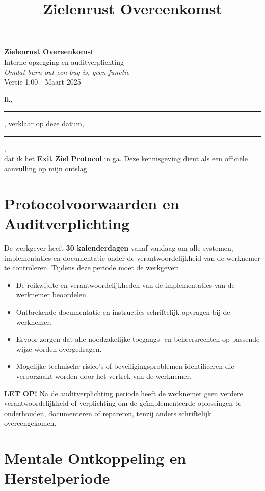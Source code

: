 \documentclass[a4paper,11pt]{article}
\title{Zielenrust Overeenkomst}
\date{}
\begin{document}
\pagestyle{empty}

\begin{center}
    {\LARGE \textbf{Zielenrust Overeenkomst}}\\[1em]
    {\large Interne opzegging en auditverplichting}\\[0.5em]
    \textit{Omdat burn-out een bug is, geen functie}\\[0.5em]
    {\small Versie 1.00 - Maart 2025}
\end{center}

\vspace{2em}

Ik, \rule{7cm}{0.2pt}, verklaar op deze datum, \rule{4cm}{0.2pt},\\
dat ik het \textbf{Exit Ziel Protocol} in ga. Deze kennisgeving dient als een officiële aanvulling op mijn ontslag.

\section*{Protocolvoorwaarden en Auditverplichting}

De werkgever heeft \textbf{30 kalenderdagen} vanaf vandaag om alle systemen, implementaties en documentatie onder de verantwoordelijkheid van de werknemer te controleren. Tijdens deze periode moet de werkgever:

\begin{itemize}
    \item De reikwijdte en verantwoordelijkheden van de implementaties van de werknemer beoordelen.
    \item Ontbrekende documentatie en instructies schriftelijk opvragen bij de werknemer.
    \item Ervoor zorgen dat alle noodzakelijke toegangs- en beheersrechten op passende wijze worden overgedragen.
    \item Mogelijke technische risico's of beveiligingsproblemen identificeren die veroorzaakt worden door het vertrek van de werknemer.
\end{itemize}

\textbf{LET OP!} Na de auditverplichting periode heeft de werknemer geen verdere verantwoordelijkheid of verplichting om de geïmplementeerde oplossingen te onderhouden, documenteren of repareren, tenzij anders schriftelijk overeengekomen.

\section*{Mentale Ontkoppeling en Herstelperiode}
\end{document}
